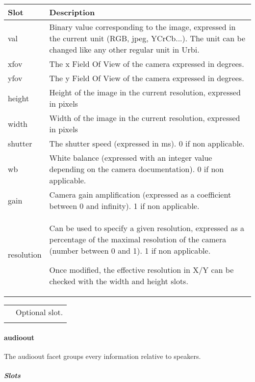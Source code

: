 \documentclass[a4paper]{article}
\begin{document}
\begin{flushleft}
\tablehead{}
\begin{supertabular}{|m{3.293cm}|m{11.997cm}|}
\hline
\sffamily\bfseries Slot &
\sffamily\bfseries Description\\\hline
val &
\sffamily Binary value corresponding to the
image, expressed in the current unit (RGB, jpeg, YCrCb...). The unit
can be changed like any other regular unit in Urbi. \\\hline
xfov &
\sffamily The x Field Of View of the camera
expressed in degrees.\\\hline
yfov &
\sffamily The y Field Of View of the camera
expressed in degrees.\\\hline
height &
\sffamily Height of the image in the current
resolution, expressed in pixels\\\hline
width &
\sffamily Width of the image in the current
resolution, expressed in pixels\\\hline
shutter &
The shutter speed (expressed
in ms). 0 if non applicable.\\\hline
wb &
White balance (expressed with
an integer value depending on the camera documentation). 0 if non
applicable.\\\hline
gain &
Camera gain amplification
(expressed as a coefficient between 0 and infinity). 1 if non
applicable.\\\hline
resolution &
 Can be used to specify a given
resolution, expressed as a percentage of the maximal resolution of the
camera (number between 0 and 1). 1 if non applicable.

\sffamily Once modified, the effective
resolution in X/Y can be checked with the width and height
slots.\\\hline
\end{supertabular}
\end{flushleft}
\begin{flushleft}
\tablehead{}
\begin{supertabular}{|m{1.717cm}|m{10.464cm}}
\hhline{-~}
 &
Optional slot.\\\hhline{-~}
\end{supertabular}
\end{flushleft}
\paragraph{audioout}


The audioout facet groups every information relative to speakers.

\subparagraph{Slots}
\end{document}
